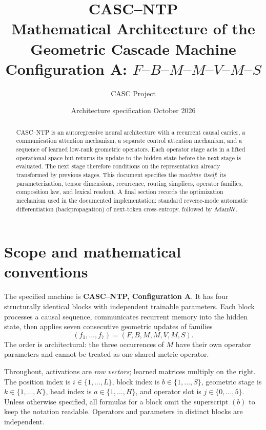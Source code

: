 \documentclass[11pt,a4paper]{article}
\title{\textbf{CASC--NTP}\\[6pt]
\large Mathematical Architecture of the Geometric Cascade Machine\\[2pt]
\normalsize Configuration A: $F$--$B$--$M$--$M$--$V$--$M$--$S$}
\author{CASC Project}
\date{Architecture specification \textbullet{} October 2026}
\begin{document}
\maketitle
\thispagestyle{plain}

\begin{abstract}
CASC--NTP is an autoregressive neural architecture with a recurrent causal carrier, a communication
attention mechanism, a separate control attention mechanism, and a sequence of learned low-rank
geometric operators. Each operator stage acts in a lifted operational space but returns its update to
the hidden state before the next stage is evaluated. The next stage therefore conditions on the
representation already transformed by previous stages. This document specifies the \emph{machine
itself}: its parameterization, tensor dimensions, recurrence, routing simplices, operator families,
composition law, and lexical readout. A final section records the optimization mechanism used in the
documented implementation: standard reverse-mode automatic differentiation (backpropagation) of
next-token cross-entropy, followed by AdamW.
\end{abstract}

\tableofcontents
\newpage

\section{Scope and mathematical conventions}

The specified machine is \textbf{CASC--NTP, Configuration A}. It has four structurally identical blocks
with independent trainable parameters. Each block processes a causal sequence, communicates recurrent
memory into the hidden state, then applies seven consecutive geometric updates of families
\begin{equation}\label{eq:families}
(f_1,\dots,f_7)=(F,B,M,M,V,M,S).
\end{equation}
The order is architectural: the three occurrences of $M$ have their own operator parameters and cannot
be treated as one shared metric operator.

Throughout, activations are \emph{row vectors}; learned matrices multiply on the right. The position
index is $i\in\{1,\dots,L\}$, block index is $b\in\{1,\dots,S\}$, geometric stage is
$k\in\{1,\dots,K\}$, head index is $a\in\{1,\dots,H\}$, and operator slot is $j\in\{0,\dots,5\}$.
Unless otherwise specified, all formulas for a block omit the superscript $(b)$ to keep the notation
readable. Operators and parameters in distinct blocks are independent.
\end{document}
